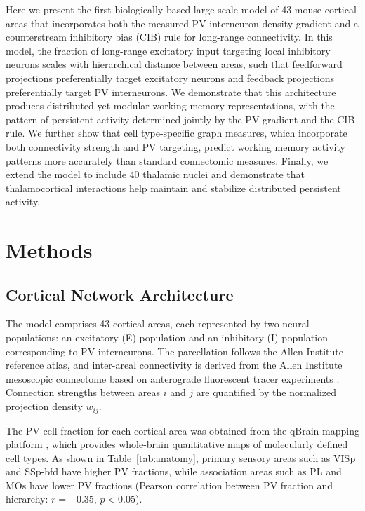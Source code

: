 \documentclass[11pt]{article}
\begin{document}
Here we present the first biologically based large-scale model of 43 mouse cortical areas that incorporates both the measured PV interneuron density gradient and a counterstream inhibitory bias (CIB) rule for long-range connectivity. In this model, the fraction of long-range excitatory input targeting local inhibitory neurons scales with hierarchical distance between areas, such that feedforward projections preferentially target excitatory neurons and feedback projections preferentially target PV interneurons. We demonstrate that this architecture produces distributed yet modular working memory representations, with the pattern of persistent activity determined jointly by the PV gradient and the CIB rule. We further show that cell type-specific graph measures, which incorporate both connectivity strength and PV targeting, predict working memory activity patterns more accurately than standard connectomic measures. Finally, we extend the model to include 40 thalamic nuclei and demonstrate that thalamocortical interactions help maintain and stabilize distributed persistent activity.

\section{Methods}

\subsection{Cortical Network Architecture}

The model comprises 43 cortical areas, each represented by two neural populations: an excitatory (E) population and an inhibitory (I) population corresponding to PV interneurons. The parcellation follows the Allen Institute reference atlas, and inter-areal connectivity is derived from the Allen Institute mesoscopic connectome based on anterograde fluorescent tracer experiments \citep{oh2014,knox2019}. Connection strengths between areas $i$ and $j$ are quantified by the normalized projection density $w_{ij}$.

The PV cell fraction for each cortical area was obtained from the qBrain mapping platform \citep{kim2017}, which provides whole-brain quantitative maps of molecularly defined cell types. As shown in Table~\ref{tab:anatomy}, primary sensory areas such as VISp and SSp-bfd have higher PV fractions, while association areas such as PL and MOs have lower PV fractions (Pearson correlation between PV fraction and hierarchy: $r = -0.35$, $p < 0.05$).
\end{document}

